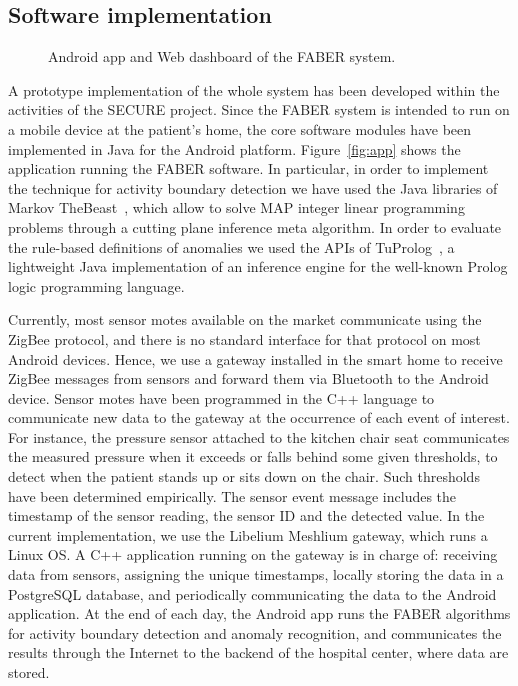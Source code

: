 \documentclass[10pt, conference, compsocconf]{IEEEtran}
\begin{document}
\subsection{Software implementation}
\begin{figure*}[t!]
\centering
{}
\caption{Android app and Web dashboard of the FABER system.\label{fig:software}}
\end{figure*}
A prototype implementation of the whole system has been developed within the
activities of the SECURE project.
Since the FABER system is intended to run on a mobile device at the patient's
home, the core software modules have been implemented in Java for the Android
platform. Figure~\ref{fig:app} shows the application running the FABER
software. 
In particular, in order to implement the technique for activity boundary
detection we have used the Java libraries of Markov TheBeast~\cite{riedel2008}, 
which allow to solve MAP integer linear programming problems through 
a cutting plane inference meta algorithm.
In order to evaluate the rule-based definitions of anomalies we used the APIs
of TuProlog~\cite{tuprolog}, a lightweight Java implementation of an inference 
engine for the well-known Prolog logic programming language.

Currently, most sensor motes available on the market communicate using the 
ZigBee protocol, and there is no standard interface for that protocol on
most Android devices. Hence, we use a gateway installed in the
smart home to receive ZigBee messages from sensors and forward them via 
Bluetooth to the Android device.
Sensor motes have been programmed in the C++ language to communicate new
data to the gateway at the occurrence of each event of interest. For instance, the pressure
sensor attached to the kitchen chair seat communicates the measured pressure 
when it exceeds or falls behind some given thresholds, to detect when the patient 
stands up or sits down on the chair. Such thresholds have been determined 
empirically. 
The sensor event message includes the timestamp of the sensor reading, the
sensor ID and the detected value.
In the current implementation, we use the Libelium Meshlium gateway, 
which runs a Linux OS. A C++ application running on
the gateway is in charge of: receiving data from sensors, assigning the
unique timestamps, locally storing the data 
in a PostgreSQL database, and periodically communicating the data to the 
Android application. At the end of each day, the Android app runs the FABER 
algorithms for activity boundary detection and anomaly recognition, and 
communicates the results through the Internet to the backend of the hospital 
center, where data are stored.
\end{document}
